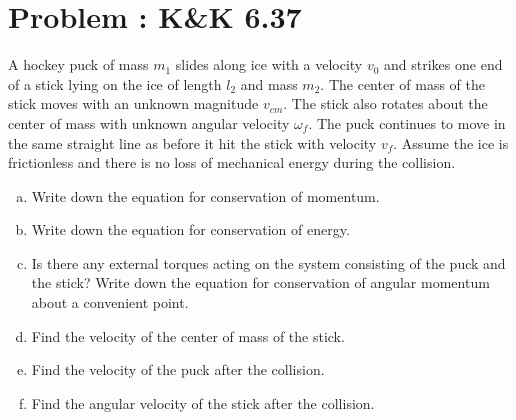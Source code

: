 \documentclass[problems]{esg8012pset}
\begin{document}
\section{Problem \thesection: K\&K 6.37}
  A hockey puck of mass $m_1$ slides along ice with a velocity $v_0$ and strikes one end of a stick lying on the ice of length $l_2$ and mass $m_2$. The center of mass of the stick moves with an unknown magnitude $v_{cm}$. The stick also rotates about the center of mass with unknown angular velocity $\omega_{f}$. The puck continues to move in the same straight line as before it hit the stick with velocity $v_f$. Assume the ice is frictionless and there is no loss of mechanical energy during the collision.
  \begin{center}
  \end{center}
  \begin{enumerate}[(a)]
    \item Write down the equation for conservation of momentum.
    \item Write down the equation for conservation of energy.
    \item Is there any external torques acting on the system consisting of the puck and the stick? Write down the equation for conservation of angular momentum about a convenient point.
    \item Find the velocity of the center of mass of the stick.
    \item Find the velocity of the puck after the collision.
    \item Find the angular velocity of the stick after the collision.
  \end{enumerate}
\end{document}
